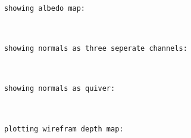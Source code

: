 \documentclass[11pt]{article}
\begin{document}
    \begin{Verbatim}[commandchars=\\\{\}]
showing albedo map:
\end{Verbatim}

    \begin{center}
    \end{center}
    { \hspace*{\fill} \\}
    
    \begin{Verbatim}[commandchars=\\\{\}]
showing normals as three seperate channels:
\end{Verbatim}

    \begin{center}
    \end{center}
    { \hspace*{\fill} \\}
    
    \begin{Verbatim}[commandchars=\\\{\}]
showing normals as quiver:
\end{Verbatim}

    \begin{center}
    \end{center}
    { \hspace*{\fill} \\}
    
    \begin{Verbatim}[commandchars=\\\{\}]
plotting wirefram depth map:
\end{Verbatim}

    \begin{center}
    \end{center}
    { \hspace*{\fill} \\}
    
    \begin{center}
    \end{center}
    { \hspace*{\fill} \\}
    
\end{document}

